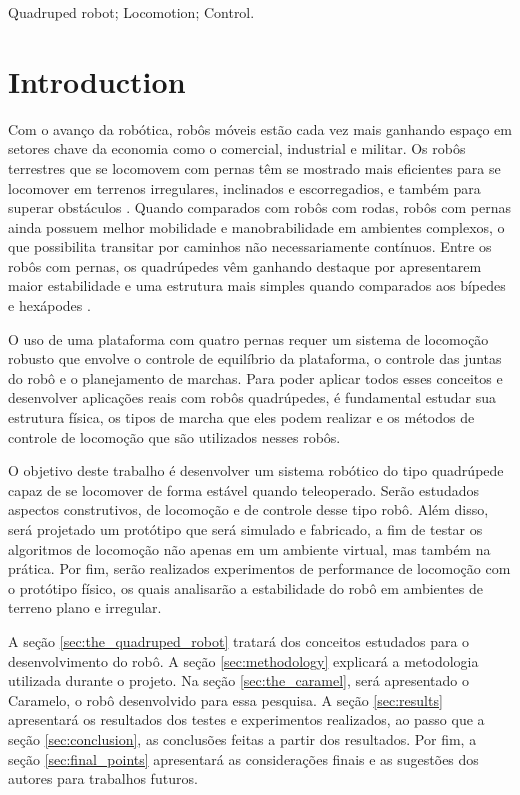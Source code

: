 \documentclass[conference]{IEEEtran}
\begin{document}
\begin{IEEEkeywords}
  Quadruped robot; Locomotion; Control.
\end{IEEEkeywords}

\section{Introduction}
Com o avanço da robótica, robôs móveis estão cada vez mais ganhando espaço em setores chave da economia como o comercial, industrial e militar. Os robôs terrestres que se locomovem com pernas têm se mostrado mais eficientes para se locomover em terrenos irregulares, inclinados e escorregadios, e também para superar obstáculos \cite{X.134}. Quando comparados com robôs com rodas, robôs com pernas ainda possuem melhor mobilidade e manobrabilidade em ambientes complexos, o que possibilita transitar por caminhos não necessariamente contínuos. Entre os robôs com pernas, os quadrúpedes vêm ganhando destaque por apresentarem maior estabilidade e uma estrutura mais simples quando comparados aos bípedes e hexápodes \cite{Shi2021}.

O uso de uma plataforma com quatro pernas requer um sistema de locomoção robusto que envolve o controle de equilíbrio da plataforma, o controle das juntas do robô e o planejamento de marchas. Para poder aplicar todos esses conceitos e desenvolver aplicações reais com robôs quadrúpedes, é fundamental estudar sua estrutura física, os tipos de marcha que eles podem realizar e os métodos de controle de locomoção que são utilizados nesses robôs.

O objetivo deste trabalho é desenvolver um sistema robótico do tipo quadrúpede capaz de se locomover de forma estável quando teleoperado. Serão estudados aspectos construtivos, de locomoção e de controle desse tipo robô. Além disso, será projetado um protótipo que será simulado e fabricado, a fim de testar os algoritmos de locomoção não apenas em um ambiente virtual, mas também na prática. Por fim, serão realizados experimentos de performance de locomoção com o protótipo físico, os quais analisarão a estabilidade do robô em ambientes de terreno plano e irregular.

A seção \ref{sec:the_quadruped_robot} tratará dos conceitos estudados para o desenvolvimento do robô. A seção \ref{sec:methodology} explicará a metodologia utilizada durante o projeto. Na seção \ref{sec:the_caramel}, será apresentado o Caramelo, o robô desenvolvido para essa pesquisa. A seção \ref{sec:results} apresentará os resultados dos testes e experimentos realizados, ao passo que a seção \ref{sec:conclusion}, as conclusões feitas a partir dos resultados. Por fim, a seção \ref{sec:final_points} apresentará as considerações finais e as sugestões dos autores para trabalhos futuros.
\end{document}

